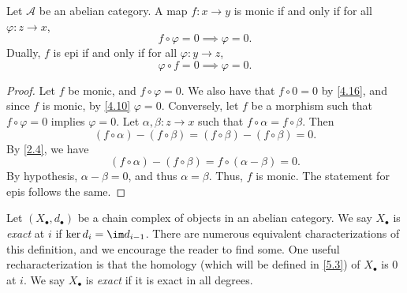 \begin{proposition}\label{4.17}
	Let $\mathcal{A} $ be an abelian category. A map $f : x \to y$ is monic if and only if for all $\varphi : z \to x$,
	\[
		f\circ \varphi =0 \implies \varphi =0
	.\]
	Dually, $f$ is epi if and only if for all $\varphi : y \to z$,
	\[
		\varphi \circ f=0 \implies \varphi =0
	.\]
\end{proposition}
\begin{proof}
	Let $f$ be monic, and $f\circ \varphi =0$. We also have that $f\circ 0=0$ by \cref{4.16}, and since $f$ is monic, by \cref{4.10} $\varphi =0$. Conversely, let $f$ be a morphism such that $f\circ \varphi =0$ implies $\varphi =0$. Let $\alpha ,\beta : z \to x$ such that $f\circ \alpha =f\circ \beta $. Then
	\[
		(f\circ \alpha )-(f\circ \beta )=(f\circ \beta )-(f\circ \beta )=0
	.\]
	By \cref{2.4}, we have
	\[
		(f\circ \alpha )-(f\circ \beta )=f\circ (\alpha -\beta )=0
	.\]
	By hypothesis, $\alpha -\beta =0$, and thus $\alpha =\beta $. Thus, $f$ is monic. The statement for epis follows the same.
\end{proof}

\begin{definition}\label{4.18}
	Let $(X_{\bullet},d_{\bullet} ) $ be a chain complex of objects in an abelian category. We say $X_{\bullet} $ is \emph{exact} at $i$ if $\ker d_i=\im d_{i-1} $. There are numerous equivalent characterizations of this definition, and we encourage the reader to find some. One useful recharacterization is that the homology (which will be defined in \cref{5.3}) of $X_{\bullet} $ is 0 at $i$. We say $X_{\bullet} $ is \emph{exact} if it is exact in all degrees.
\end{definition}

